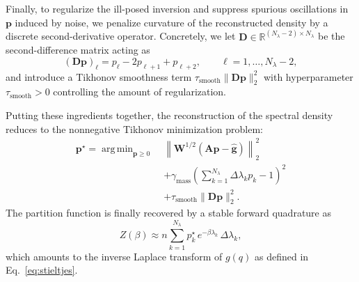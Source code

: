 \documentclass[10pt,aps,pre,twocolumn,nofootinbib,superscriptaddress,longbibliography]{revtex4-2}
\newcommand{\bA}{\mathbf{A}}
\newcommand{\bD}{\mathbf{D}}
\newcommand{\bW}{\mathbf{W}}
\DeclareMathOperator*{\argmin}{arg\,min}
\begin{document}
Finally, to regularize the ill-posed inversion and suppress spurious oscillations in $\mathbf{p}$ induced by noise, we penalize curvature of the reconstructed density by a discrete second-derivative operator. 
Concretely, we let $\bD\in\mathbb{R}^{(N_\lambda-2)\times N_\lambda}$ be the second-difference matrix acting as
\begin{equation}
  (\bD\mathbf{p})_\ell = p_\ell - 2p_{\ell+1} + p_{\ell+2}, \qquad \ell=1,\ldots,N_\lambda-2,
\end{equation}
and introduce a Tikhonov smoothness term $\tau_{\mathrm{smooth}}\|\bD\mathbf{p}\|_2^2$ with hyperparameter $\tau_{\mathrm{smooth}}>0$ controlling the amount of regularization.

Putting these ingredients together, the reconstruction of the spectral density reduces to the nonnegative Tikhonov minimization problem:
\begin{align}
\mathbf{p}^\star
= \argmin_{\mathbf{p}\ge 0}\;
    &\left\|\bW^{1/2}\left(\bA\mathbf{p}-\hat{\mathbf{g}}\right)\right\|_2^2 \\
    & + \gamma_{\mathrm{mass}}\left(\sum_{k=1}^{N_\lambda}\Delta\lambda_k p_k - 1\right)^2 \\
    & + \tau_{\mathrm{smooth}}\|\bD\mathbf{p}\|_2^2 .
\end{align}
The partition function is finally recovered by a stable forward quadrature as
\begin{equation}
  Z(\beta) \approx
  n \sum_{k=1}^{N_\lambda} p_k^\star\, e^{-\beta \lambda_k}\,\Delta\lambda_k,
\end{equation}
which amounts to the inverse Laplace transform of $g(q)$ as defined in Eq.~\ref{eq:stieltjes}.



\end{document}
